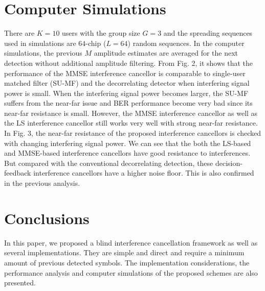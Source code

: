 \documentclass[a4paper,10pt,fleqn, twocolumn]{IEEETran}
\begin{document}
\section{Computer Simulations}
There are $K=10$ users with the group size $G=3$ and the spreading
sequences used in simulations are $64$-chip ($L=64$) random
sequences. In the computer simulations, the previous $M$ amplitude
estimates are averaged for the next detection without additional
amplitude filtering. From Fig. 2, it shows that the performance of
the MMSE interference cancellor is comparable to single-user
matched filter (SU-MF) and the decorrelating detector when
interfering signal power is small. When the interfering signal
power becomes larger, the SU-MF suffers from the near-far issue
and BER performance become very bad since its near-far resistance
is small. However, the MMSE interference cancellor as well as the
LS interference cancellor still works very well with strong
near-far resistance. In Fig. 3, the near-far resistance of the
proposed interference cancellors is checked with changing
interfering signal power. We can see that the both the LS-based
and MMSE-based interference cancellors have good resistance to
interferences. But compared with the conventional decorrelating
detection, these decision-feedback interference cancellors have a
higher noise floor. This is also confirmed in the previous
analysis.
\begin{figure}\hspace{-0.5in} \label{BER_SNR}
\end{figure}
\begin{figure} \label{BER_A_SNR}
\end{figure}
\section{Conclusions}
In this paper, we proposed a blind interference cancellation
framework as well as several implementations. They are simple and
direct and require a minimum amount of previous detected symbols.
The implementation considerations, the performance analysis and
computer simulations of the proposed schemes are also presented.
\small

\end{document}
